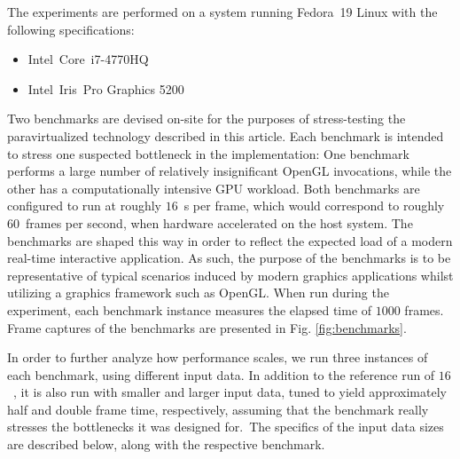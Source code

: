 The experiments are performed on a system running Fedora~19 Linux with the following specifications:
\begin{itemize}
\item Intel\circledR\ Core\texttrademark\ i7-4770HQ
\item Intel\circledR\ Iris\texttrademark\ Pro Graphics 5200
\end{itemize}

Two benchmarks are devised on-site for the purposes of stress-testing the paravirtualized technology described in this article.
Each benchmark is intended to stress one suspected bottleneck in the implementation: One benchmark performs a large number of relatively insignificant OpenGL invocations, while the other has a computationally intensive GPU workload.
Both benchmarks are configured to run at roughly $16$~\milli\second s per frame, which would correspond to roughly $60$~frames per second, when hardware accelerated on the host system.
The benchmarks are shaped this way in order to reflect the expected load of a modern real-time interactive application.
As such, the purpose of the benchmarks is to be representative of typical scenarios induced by modern graphics applications whilst utilizing a graphics framework such as OpenGL.
When run during the experiment, each benchmark instance measures the elapsed time of $1000$ frames.
Frame captures of the benchmarks are presented in Fig. \ref{fig:benchmarks}.

In order to further analyze how performance scales, we run three instances of each benchmark, using different input data.
In addition to the reference run of $16$~\milli\second , it is also run with smaller and larger input data, tuned to yield approximately half and double frame time, respectively, assuming that the benchmark really stresses the bottlenecks it was designed for.\
The specifics of the input data sizes are described below, along with the respective benchmark.

